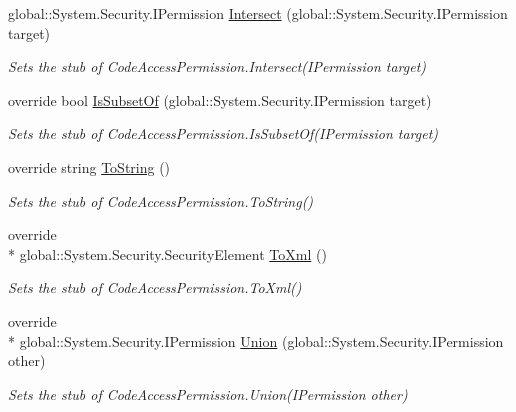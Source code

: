 \begin{DoxyCompactItemize}
global\-::\-System.\-Security.\-I\-Permission \hyperlink{class_system_1_1_security_1_1_fakes_1_1_stub_code_access_permission_ad1d3b99c3f81867a78529eb79ececc80}{Intersect} (global\-::\-System.\-Security.\-I\-Permission target)
\begin{DoxyCompactList}\small\item\em Sets the stub of Code\-Access\-Permission.\-Intersect(\-I\-Permission target)\end{DoxyCompactList}\item 
override bool \hyperlink{class_system_1_1_security_1_1_fakes_1_1_stub_code_access_permission_a3331b73a9109c1597a5d18100205c857}{Is\-Subset\-Of} (global\-::\-System.\-Security.\-I\-Permission target)
\begin{DoxyCompactList}\small\item\em Sets the stub of Code\-Access\-Permission.\-Is\-Subset\-Of(\-I\-Permission target)\end{DoxyCompactList}\item 
override string \hyperlink{class_system_1_1_security_1_1_fakes_1_1_stub_code_access_permission_a6bc9161bb08adbbb4abd5b4f543a1c61}{To\-String} ()
\begin{DoxyCompactList}\small\item\em Sets the stub of Code\-Access\-Permission.\-To\-String()\end{DoxyCompactList}\item 
override \\*
global\-::\-System.\-Security.\-Security\-Element \hyperlink{class_system_1_1_security_1_1_fakes_1_1_stub_code_access_permission_a5a5521602af2fc45a0fc93ee13f1c9d3}{To\-Xml} ()
\begin{DoxyCompactList}\small\item\em Sets the stub of Code\-Access\-Permission.\-To\-Xml()\end{DoxyCompactList}\item 
override \\*
global\-::\-System.\-Security.\-I\-Permission \hyperlink{class_system_1_1_security_1_1_fakes_1_1_stub_code_access_permission_a35b5ef904374edf4df10fcac1309ccc5}{Union} (global\-::\-System.\-Security.\-I\-Permission other)
\begin{DoxyCompactList}\small\item\em Sets the stub of Code\-Access\-Permission.\-Union(\-I\-Permission other)\end{DoxyCompactList}\end{DoxyCompactItemize}
